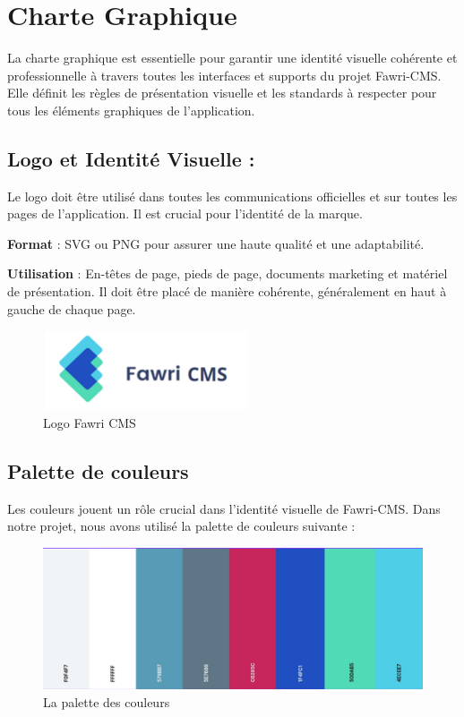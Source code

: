 \section{Charte Graphique}

\hspace{\parindent}La charte graphique est essentielle pour garantir une identité visuelle cohérente et professionnelle à travers toutes les interfaces et supports du projet Fawri-CMS. Elle définit les règles de présentation visuelle et les standards à respecter pour tous les éléments graphiques de l'application.

\subsection{Logo et Identité Visuelle :}

\hspace{\parindent}Le logo doit être utilisé dans toutes les communications officielles et sur toutes les pages de l'application. Il est crucial pour l'identité de la marque.

\textbf{Format} : SVG ou PNG pour assurer une haute qualité et une adaptabilité.

\textbf{Utilisation} : En-têtes de page, pieds de page, documents marketing et matériel de présentation. Il doit être placé de manière cohérente, généralement en haut à gauche de chaque page.
\\
\begin{figure}[H]
  \centering
  \includegraphics[width=6cm]{Figures/fawri_cms_logo.PNG}
  \caption{Logo Fawri CMS}
\end{figure}


\subsection{Palette de couleurs}
\hspace{\parindent}Les couleurs jouent un rôle crucial dans l'identité visuelle de Fawri-CMS. Dans notre projet, nous avons utilisé la palette de couleurs suivante :
\\
\begin{figure}[H]
  \centering
  \includegraphics[width=12cm]{Figures/palette.PNG}
  \caption{La palette des couleurs}
\end{figure}



